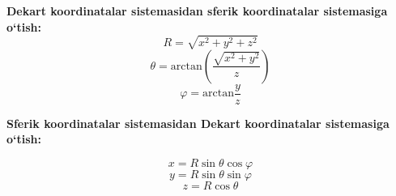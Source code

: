 \documentclass{article}
\begin{document}
\hspace{0.4cm}
\textbf{Dekart koordinatalar sistemasidan sferik koordinatalar sistemasiga o`tish:}
$$R = \sqrt{x^{2} + y^{2} + z^{2}}$$
$$\theta = \textrm{arctan}\left( \frac{\sqrt{x^{2} + y^{2}}}{z}\right) $$
$$ \varphi = \textrm{arctan}\frac{y}{z} $$


\textbf{Sferik koordinatalar sistemasidan Dekart koordinatalar sistemasiga o`tish:}

$$x = R\sin{\theta}\cos{\varphi}$$
$$y = R\sin{\theta}\sin{\varphi}$$
$$z = R\cos{\theta}$$
\end{document}
